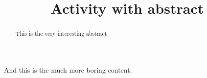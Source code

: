 \documentclass{ximera}
\begin{document}
    \title{Activity with abstract}
    \begin{abstract}
    This is the very interesting abstract
    \end{abstract}
    \maketitle
    

    And this is the much more boring content.
\end{document}

